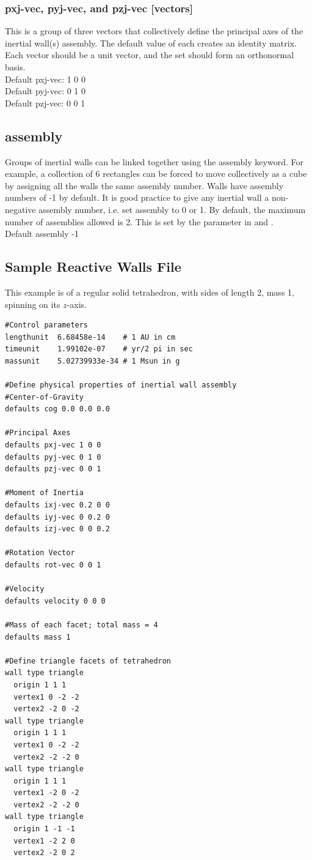 \subsubsection{pxj-vec, pyj-vec, and pzj-vec [vectors]}

This is a group of three vectors that collectively define the
principal axes of the inertial wall(s) assembly.  The default value of
each creates an identity matrix. Each vector should be a unit vector,
and the set should form an orthonormal basis.\\
Default pxj-vec: 1 0 0\\ 
Default pyj-vec: 0 1 0\\
Default pzj-vec: 0 0 1

\subsection{assembly}

Groups of inertial walls can be linked together using the assembly
keyword. For example, a collection of 6 rectangles can be forced to
move collectively as a cube by assigning all the walls the same
assembly number. Walls have assembly numbers of -1 by default. It is
good practice to give any inertial wall a non-negative assembly
number, i.e. set assembly to 0 or 1. By default, the maximum number of
assemblies allowed is 2. This is set by the
 parameter in  and
.\\
Default assembly -1

\subsection{Sample Reactive Walls File}

This example is of a regular solid tetrahedron, with sides of length
2, mass 1, spinning on its $z$-axis.

\begin{verbatim}
#Control parameters
lengthunit  6.68458e-14    # 1 AU in cm 
timeunit    1.99102e-07    # yr/2 pi in sec 
massunit    5.02739933e-34 # 1 Msun in g

#Define physical properties of inertial wall assembly
#Center-of-Gravity
defaults cog 0.0 0.0 0.0

#Principal Axes
defaults pxj-vec 1 0 0
defaults pyj-vec 0 1 0
defaults pzj-vec 0 0 1

#Moment of Inertia
defaults ixj-vec 0.2 0 0 
defaults iyj-vec 0 0.2 0
defaults izj-vec 0 0 0.2

#Rotation Vector
defaults rot-vec 0 0 1

#Velocity
defaults velocity 0 0 0

#Mass of each facet; total mass = 4
defaults mass 1

#Define triangle facets of tetrahedron 
wall type triangle
  origin 1 1 1
  vertex1 0 -2 -2
  vertex2 -2 0 -2
wall type triangle
  origin 1 1 1
  vertex1 0 -2 -2
  vertex2 -2 -2 0
wall type triangle
  origin 1 1 1
  vertex1 -2 0 -2
  vertex2 -2 -2 0
wall type triangle
  origin 1 -1 -1
  vertex1 -2 2 0
  vertex2 -2 0 2
\end{verbatim}

